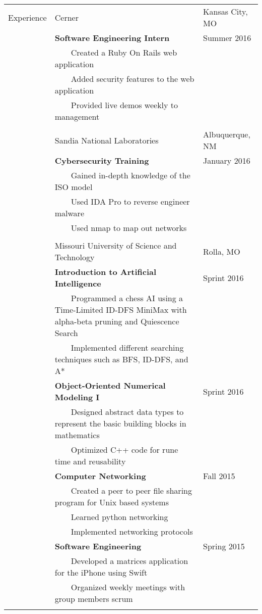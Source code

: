 \documentclass[10.5pt, arial]{article}
\newcommand{\tabitem}{~~\llap{\textbullet}~~}
\begin{document}
\begin{tabular}{p{1.5cm} p{12.9cm} l}
Experience  & Cerner 															& Kansas City, MO 		\\
			& \textbf{Software Engineering Intern} 								& Summer 2016			\\
			& \tabitem Created a Ruby On Rails web application 					& 						\\
			& \tabitem Added security features to the web application			& 						\\
			& \tabitem Provided live demos weekly to management 					& 						\\ \\

			& Sandia National Laboratories										& Albuquerque, NM 		\\
			& \textbf{Cybersecurity Training} 									& January 2016 			\\
			& \tabitem Gained in-depth knowledge of the ISO model 				& 						\\
			& \tabitem Used IDA Pro to reverse engineer malware 				& 						\\
			& \tabitem Used nmap to map out networks 							& 						\\ \\

			& Missouri University of Science and Technology						& Rolla, MO 			\\
			& \textbf{Introduction to Artificial Intelligence} 					& Sprint 2016 			\\
			& \tabitem Programmed a chess AI using a Time-Limited ID-DFS MiniMax with alpha-beta pruning and Quiescence Search	& \\
			& \tabitem Implemented different searching techniques such as BFS, ID-DFS, and A* 	& 		\\

			& \textbf{Object-Oriented Numerical Modeling I} 					& Sprint 2016 			\\
			& \tabitem Designed abstract data types to represent the basic building blocks in mathematics & \\
			& \tabitem Optimized C++ code for rune time and reusability 		& 						\\

			& \textbf{Computer Networking} 										& Fall 2015 			\\
			& \tabitem Created a peer to peer file sharing program for Unix based systems 		& 		\\
			& \tabitem Learned python networking 								& 						\\
			& \tabitem Implemented networking protocols 						& 						\\

			& \textbf{Software Engineering} 									& Spring 2015 			\\
			& \tabitem Developed a matrices application for the iPhone using Swift& 						\\
			& \tabitem Organized weekly meetings with group members scrum 		& 						\\ \\


\end{tabular}
\end{document}
